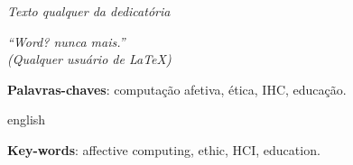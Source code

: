 \documentclass[
    12pt,                   %
    openright,              %
    oneside,                %
    a4paper,                %
    sumario=tradicional,    %
    english,                %
    brazil,                 %
    ]{abntex2}
\begin{document}
\frenchspacing

\pretextual

\imprimircapa

\imprimirfolhaderosto

\imprimirfolhadeaprovacao

\begin{dedicatoria}
   \vspace*{\fill}
   \centering
   \noindent
   \textit{Texto qualquer da dedicatória}
   \vspace*{\fill}
\end{dedicatoria}

\begin{agradecimentos}
\end{agradecimentos}

\begin{epigrafe}
    \vspace*{\fill}
    \begin{flushright}
        \textit{``Word? nunca mais.''\\
        (Qualquer usuário de \LaTeX)}
    \end{flushright}
\end{epigrafe}


\begin{resumo}
 \noindent

 \vspace{\onelineskip}

 \noindent
 \textbf{Palavras-chaves}: computação afetiva, ética, IHC, educação.
\end{resumo}

\begin{resumo}[Abstract]
\begin{otherlanguage*}{english}
   \noindent

   \vspace{\onelineskip}

   \noindent
   \textbf{Key-words}: affective computing, ethic, HCI, education.
 \end{otherlanguage*}
\end{resumo}
\end{document}
